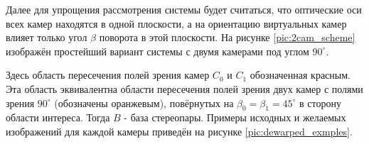 Далее для упрощения рассмотрения системы будет считаться, что оптические оси всех камер находятся в одной плоскости, 
а на ориентацию виртуальных камер влияет только угол $ \beta $ поворота в этой плоскости. 
На рисунке \ref{pic:2cam_scheme} изображён простейший вариант системы с двумя камерами под углом $90^\circ$.


  Здесь область пересечения полей зрения камер $C_0$ и $C_1$ обозначенная красным.
Эта область эквивалентна области пересечения полей зрения двух камер с полями зрения $90^\circ$ (обозначены
оранжевым), повёрнутых на $\beta_0 = \beta_1  = 45^\circ$ в сторону области интереса. Тогда $B$ - база стереопары.
Примеры исходных и желаемых изображений для каждой камеры приведён на рисунке \ref{pic:dewarped_exmples}. 


\newpage

